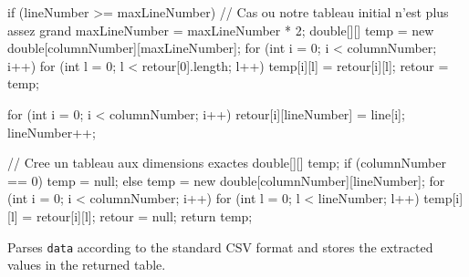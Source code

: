 \begin{code}
\begin{hide}
{{{{               if (lineNumber >= maxLineNumber) { // Cas ou notre tableau initial n'est plus assez grand
                  maxLineNumber = maxLineNumber * 2;
                  double[][] temp = new double[columnNumber][maxLineNumber];
                  for (int i = 0; i < columnNumber; i++)
                     for (int l = 0; l < retour[0].length; l++)
                        temp[i][l] = retour[i][l];
                  retour = temp;
               }

               for (int i = 0; i < columnNumber; i++)
                  retour[i][lineNumber] = line[i];
               lineNumber++;
            }
         }
      }
      // Cree un tableau aux dimensions exactes
      double[][] temp;
      if (columnNumber == 0)
         temp = null;
      else
         temp = new double[columnNumber][lineNumber];
      for (int i = 0; i < columnNumber; i++)
         for (int l = 0; l < lineNumber; l++)
            temp[i][l] = retour[i][l];
      retour = null;
      return temp;
   }\end{hide}
\end{code}
\begin{tabb}
   Parses \texttt{data} according to the standard CSV format
   and stores the extracted values in the returned table.
\end{tabb}
\begin{htmlonly}
\end{htmlonly}
